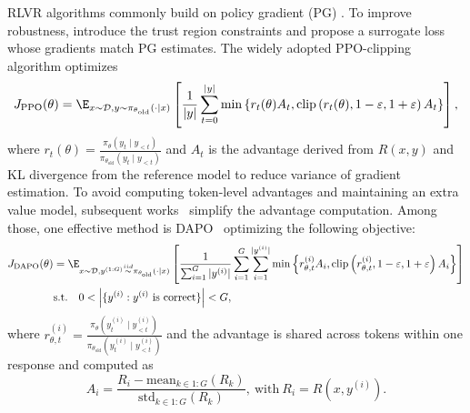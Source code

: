 \documentclass{article} %
\begin{document}
RLVR algorithms commonly build on policy gradient (PG) \citep{williams1992simple}. To improve robustness, \citet{schulman2015trust,schulman2017proximal} introduce the trust region constraints and propose a surrogate loss whose gradients match PG estimates. The widely adopted PPO-clipping algorithm optimizes
\begin{equation*}
J_{\text{PPO}}(\theta) =
\E_{x \sim \mathcal{D},y \sim \pi_{\theta_{\text{old}}}(\cdot\mid x)}
\left[\frac{1}{|y|}
\sum_{t=0}^{|y|}\min\left\{r_t(\theta)A_t,\mathrm{clip}\left(r_t(\theta),1-\varepsilon,1+\varepsilon\right)A_t\right\}
\right],
\end{equation*}
where $r_t(\theta)=\tfrac{\pi_{\theta}(y_t \mid y_{<t})}{\pi_{\theta_{\text{old}}}(y_t \mid y_{<t})}$ and $A_t$ is the advantage derived from $R(x,y)$ and KL divergence from the reference model to reduce variance of gradient estimation. 
To avoid computing token-level advantages and maintaining an extra value model, 
subsequent works~\citep{shao2024deepseekmath,yu2025dapo} simplify the advantage computation. 
Among those, one effective method is DAPO~\citep{yu2025dapo} optimizing the following objective:
\begin{align*}
J_{\text{DAPO}}(\theta) 
&=\E_{x \sim \mathcal{D},y^{(1:G)} \overset{iid}{\sim} \pi_{\theta_{\text{old}}}(\cdot\mid x)}
\left[\frac{1}{\sum_{i=1}^G |y^{(i)}|}\sum_{i=1}^G\sum_{i=1}^{|y^{(i)}|}\min\left\{r^{(i)}_{\theta,t}A_i,\mathrm{clip}\left(r^{(i)}_{\theta,t},1-\varepsilon,1+\varepsilon\right)A_i\right\}
\right]\\
&\mathrm{s.t.}\quad0<\left|\{y^{(i)}:y^{(i)}\mathrm{~is~correct}\}\right|<G,
\end{align*}
where $r^{(i)}_{\theta,t}=\frac{\pi_{\theta}(y^{(i)}_{t} \mid y^{(i)}_{<t})}{\pi_{\theta_{\text{old}}}(y^{(i)}_{t} \mid y^{(i)}_{<t})}$ and the advantage is shared across tokens within one response and computed as
\[
A_i=\frac{R_i-\mathrm{mean}_{k\in 1:G}(R_k)}{\mathrm{std}_{k\in 1:G}(R_k)},~
\mathrm{with}~R_i=R(x,y^{(i)}).
\]
\end{document}
